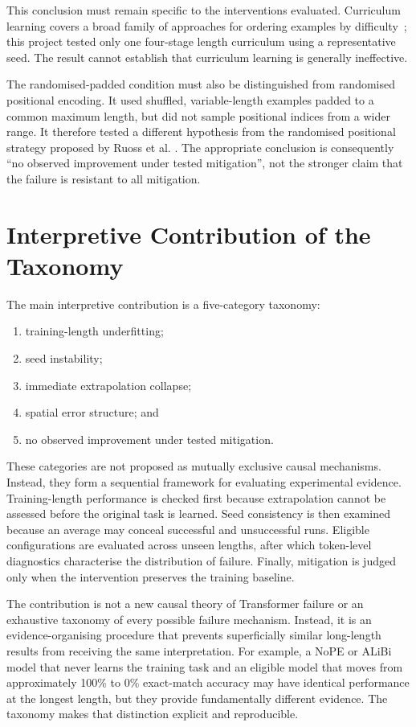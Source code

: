 \documentclass[
    author={Aanchala Ravindra Bhongade},
    supervisor={Dr. Fernando Moreno-Pino},
    degree={MSc},
    title={Length Generalisation in Transformer-Based Sequence Models: Failure Taxonomy and Mitigation Strategies},
    subtitle={},
    type={},
    year={2026}
]{dissertation}
\begin{document}
This conclusion must remain specific to the interventions evaluated.
Curriculum learning covers a broad family of approaches for ordering examples by difficulty~\cite{bengio2009curriculum}; this project tested only one four-stage length curriculum using a representative seed. The result cannot establish that curriculum learning is generally ineffective.

The randomised-padded condition must also be distinguished from randomised positional encoding. It used shuffled, variable-length examples padded to a common maximum length, but did not sample positional indices from a wider range. It therefore tested a different hypothesis from the randomised positional strategy proposed by Ruoss et al. \cite{ruoss2023randomized}. The appropriate conclusion is consequently ``no observed improvement under tested mitigation'', not the stronger claim that the failure is resistant to all mitigation.

\section{Interpretive Contribution of the Taxonomy}
\label{sec:discussion-taxonomy}

The main interpretive contribution is a five-category taxonomy:

\begin{enumerate}
    \item training-length underfitting;
    \item seed instability;
    \item immediate extrapolation collapse;
    \item spatial error structure; and
    \item no observed improvement under tested mitigation.
\end{enumerate}

These categories are not proposed as mutually exclusive causal mechanisms. Instead, they form a sequential framework for evaluating experimental evidence. Training-length performance is checked first because extrapolation cannot be assessed before the original task is learned. Seed consistency is then examined because an average may conceal successful and unsuccessful runs. Eligible configurations are evaluated across unseen lengths, after which token-level diagnostics characterise the distribution of failure. Finally, mitigation is judged only when the intervention preserves the training baseline.

The contribution is not a new causal theory of Transformer failure or an exhaustive taxonomy of every possible failure mechanism. Instead, it is an evidence-organising procedure that prevents superficially similar long-length results from receiving the same interpretation. For example, a NoPE or ALiBi model that never learns the training task and an eligible model that moves from approximately 100\% to 0\% exact-match accuracy may have identical performance at the longest length, but they provide fundamentally different evidence. The taxonomy makes that distinction explicit and reproducible.
\end{document}
